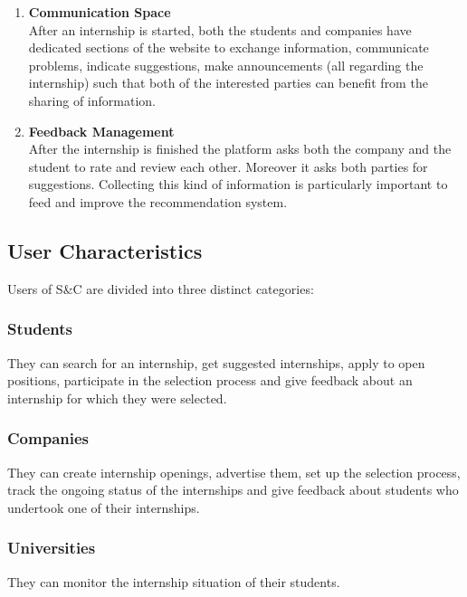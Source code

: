 \begin{enumerate}
        \item \textbf {Communication Space}
        \\ After an internship is started, both the students and companies have dedicated sections of the website to exchange information, communicate problems, indicate suggestions, make announcements (all regarding the internship) such that both of the interested parties can benefit from the sharing of information. 
        \newpage
        \item \textbf {Feedback Management}
        \\ After the internship is finished the platform asks both the company and the student to rate and review each other. Moreover it asks both parties for suggestions. Collecting this kind of information is particularly important to feed and improve the recommendation system.
    \end{enumerate}



\subsection{User Characteristics}
    Users of S\&C are divided into three distinct categories:


\subsubsection{Students}
    They can search for an internship, get suggested internships, apply to open positions, participate in the selection process and give feedback about an internship for which they were selected.


\subsubsection{Companies}
    They can create internship openings, advertise them, set up the selection process, track the ongoing status of the internships and give feedback about students who undertook one of their internships.


\subsubsection{Universities}            %
    They can monitor the internship situation of their students.
    
